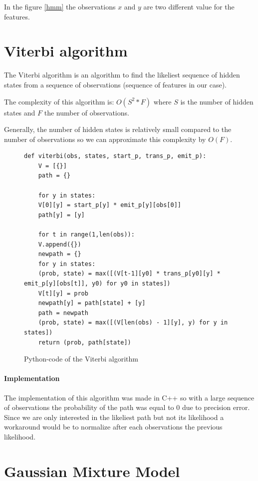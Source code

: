\documentclass{techrep} %
\begin{document}
In the figure \ref{hmm} the observations $x$ and $y$ are two different
value for the features.

\section{Viterbi algorithm}

The Viterbi algorithm is an algorithm to find the likeliest sequence
of hidden states from a sequence of observations (sequence of features
in our case).


The complexity of this algorithm is: $O(S^2*F)$ where
$S$ is the number of hidden states and $F$ the number of observations.


Generally, the number of hidden states is relatively small compared to the number
of observations so we can approximate this complexity by $O(F)$.

\begin{figure}[H]
  \begin{lstlisting}[frame=single]
    def viterbi(obs, states, start_p, trans_p, emit_p):
    V = [{}]
    path = {}

    for y in states:
    V[0][y] = start_p[y] * emit_p[y][obs[0]]
    path[y] = [y]

    for t in range(1,len(obs)):
    V.append({})
    newpath = {}
    for y in states:
    (prob, state) = max([(V[t-1][y0] * trans_p[y0][y] * emit_p[y][obs[t]], y0) for y0 in states])
    V[t][y] = prob
    newpath[y] = path[state] + [y]
    path = newpath
    (prob, state) = max([(V[len(obs) - 1][y], y) for y in states])
    return (prob, path[state])
  \end{lstlisting}
  \caption{Python-code of the Viterbi algorithm}
  \label{viter}
\end{figure}

\paragraph{Implementation} The implementation of this algorithm was made in C++ so
with a large sequence of observations the probability of the path was
equal to 0 due to precision error. Since we are only interested in
the likeliest path but not its likelihood a workaround would be to
normalize after each observations the previous likelihood.

\section{Gaussian Mixture Model}
\end{document}
